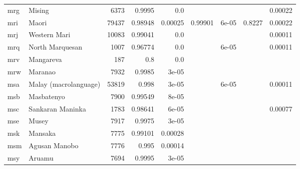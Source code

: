 \documentclass[11pt]{article}
\begin{document}
\begin{table*}[h]
{\begin{tabular}{llrrrrrrr}
mrg         & Mising         & 6373         & 0.9995         & 0.0         &          &          &          & 0.00022         \\

mri         & Maori         & 79437         & 0.98948         & 0.00025         & 0.99901         & 6e-05         & 0.8227         & 0.00022         \\

mrj         & Western Mari         & 10083         & 0.99041         & 0.0         &          &          &          & 0.00011         \\

mrq         & North Marquesan         & 1007         & 0.96774         & 0.0         &          & 6e-05         &          & 0.00011         \\

mrv         & Mangareva         & 187         & 0.8         & 0.0         &          &          &          &          \\

mrw         & Maranao         & 7932         & 0.9985         & 3e-05         &          &          &          &          \\

msa         & Malay (macrolanguage)         & 53819         & 0.998         & 3e-05         &          & 6e-05         &          & 0.00011         \\

msb         & Masbatenyo         & 7900         & 0.99549         & 8e-05         &          &          &          &          \\

msc         & Sankaran Maninka         & 1783         & 0.98641         & 6e-05         &          &          &          & 0.00077         \\

mse         & Musey         & 7917         & 0.9975         & 3e-05         &          &          &          &          \\

msk         & Mansaka         & 7775         & 0.99101         & 0.00028         &          &          &          &          \\

msm         & Agusan Manobo         & 7776         & 0.995         & 0.00014         &          &          &          &          \\

msy         & Aruamu         & 7694         & 0.9995         & 3e-05         &          &          &          &          \\


\end{tabular}}
\end{table*}
\end{document}
